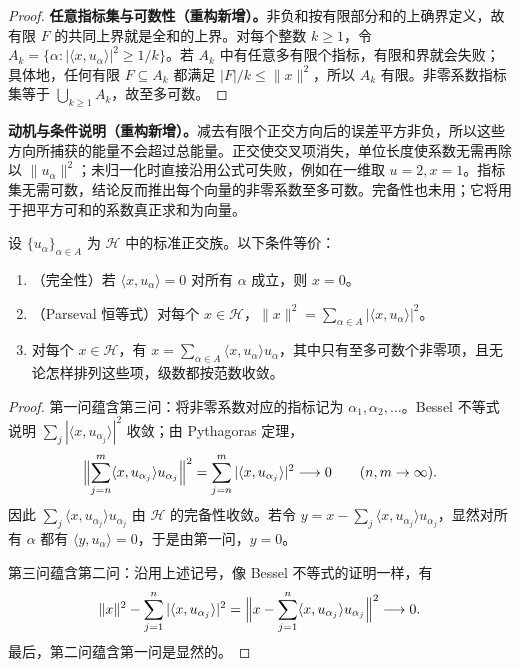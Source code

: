 \documentclass[../../main.tex]{subfiles}
\begin{document}
\begin{proof}
\textbf{任意指标集与可数性（重构新增）。}非负和按有限部分和的上确界定义，故有限 $F$ 的共同上界就是全和的上界。对每个整数 $k\geqslant1$，令 $A_k=\{\alpha:|\langle x,u_\alpha\rangle|^2\geqslant1/k\}$。若 $A_k$ 中有任意多有限个指标，有限和界就会失败；具体地，任何有限 $F\subseteq A_k$ 都满足 $|F|/k\leqslant\|x\|^2$，所以 $A_k$ 有限。非零系数指标集等于 $\bigcup_{k\geqslant1}A_k$，故至多可数。
\end{proof}
\begin{remark}
\textbf{动机与条件说明（重构新增）。}减去有限个正交方向后的误差平方非负，所以这些方向所捕获的能量不会超过总能量。正交使交叉项消失，单位长度使系数无需再除以 $\|u_\alpha\|^2$；未归一化时直接沿用公式可失败，例如在一维取 $u=2,x=1$。指标集无需可数，结论反而推出每个向量的非零系数至多可数。完备性也未用；它将用于把平方可和的系数真正求和为向量。
\end{remark}
\begin{theorem}\label{theorem:ch05-orthonormal-completeness}
设 $\{u_\alpha\}_{\alpha\in A}$ 为 $\mathscr H$ 中的标准正交族。以下条件等价：
\begin{enumerate}
\item\label{item:ch05-orthonormal-total} （完全性）若 $\langle x,u_\alpha\rangle=0$ 对所有 $\alpha$ 成立，则 $x=0$。
\item\label{item:ch05-parseval} （Parseval 恒等式）对每个 $x\in\mathscr H$，$\|x\|^2=\sum_{\alpha\in A}|\langle x,u_\alpha\rangle|^2$。
\item\label{item:ch05-orthogonal-expansion} 对每个 $x\in\mathscr H$，有 $x=\sum_{\alpha\in A}\langle x,u_\alpha\rangle u_\alpha$，其中只有至多可数个非零项，且无论怎样排列这些项，级数都按范数收敛。
\end{enumerate}
\end{theorem}
\begin{proof}
第一问蕴含第三问：将非零系数对应的指标记为 $\alpha_1,\alpha_2,\ldots$。Bessel 不等式说明 $\sum_j|\langle x,u_{\alpha_j}\rangle|^2$ 收敛；由 Pythagoras 定理，
\begin{align*}
\Bigl\|\sum_{j=n}^m\langle x,u_{\alpha_j}\rangle u_{\alpha_j}\Bigr\|^2
=\sum_{j=n}^m|\langle x,u_{\alpha_j}\rangle|^2\longrightarrow0
\qquad(n,m\to\infty).
\end{align*}
因此 $\sum_j\langle x,u_{\alpha_j}\rangle u_{\alpha_j}$ 由 $\mathscr H$ 的完备性收敛。若令 $y=x-\sum_j\langle x,u_{\alpha_j}\rangle u_{\alpha_j}$，显然对所有 $\alpha$ 都有 $\langle y,u_\alpha\rangle=0$，于是由第一问，$y=0$。

第三问蕴含第二问：沿用上述记号，像 Bessel 不等式的证明一样，有
\begin{align*}
\|x\|^2-\sum_{j=1}^n|\langle x,u_{\alpha_j}\rangle|^2
=\Bigl\|x-\sum_{j=1}^n\langle x,u_{\alpha_j}\rangle u_{\alpha_j}\Bigr\|^2\longrightarrow0.
\end{align*}
最后，第二问蕴含第一问是显然的。
\end{proof}
\end{document}
